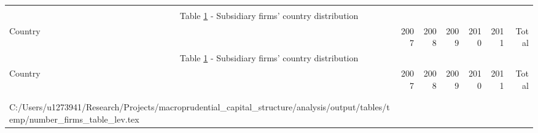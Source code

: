\documentclass[12pt]{article}
\makeatletter
\newcommand\primitiveinput[1]
{\@@input #1 }
\makeatother
\begin{document}
	

	\begin{small}
	{
		\begin{longtable}{lrrrrrr}\\
			\label{tab:number of firms}\\
			\multicolumn{7}{c}{Table \ref{tab:number of firms} - Subsidiary firms' country distribution}\\
			\hline \hline \addlinespace Country & 2007 & 2008 & 2009 & 2010 & 2011 & Total  \\
			\endfirsthead
			\multicolumn{7}{c}{Table \ref{tab:number of firms} - Subsidiary firms' country distribution}\\
			\hline \hline \addlinespace Country & 2007 & 2008 & 2009 & 2010 & 2011 & Total  \\
			\hline \addlinespace \endhead
			\hline
			\multicolumn{7}{r}{{\textit{(Continued)}}}\\ \endfoot
			\\ 	
			\endlastfoot
			\primitiveinput{C:/Users/u1273941/Research/Projects/macroprudential_capital_structure/analysis/output/tables/temp/number_firms_table_lev.tex}
			\hline 			
		\end{longtable}	
	}
\end{small}
\end{document}
